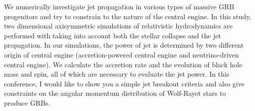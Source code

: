 


\bigskip



\bigskip

\noindent We numerically investigate jet propagation in various types of massive GRB progenitors and try to constrain to the nature of the central engine. In this study, two dimensional axisymmetric simulations of relativistic hydrodynamics are performed with taking into account both the stellar collapse and the jet propagation. In our simulations, the power of jet is determined by two different origin of central engine (accretion-powered central engine and neutrino-driven central engine). We calculate the accretion rate and the evolution of black hole mass and spin, all of which are necessary to evaluate the jet power. In this conference, I would like to show you a simple jet breakout criteria and also give constraints on the angular momentum distribution of Wolf-Rayet stars to produce GRBs.

